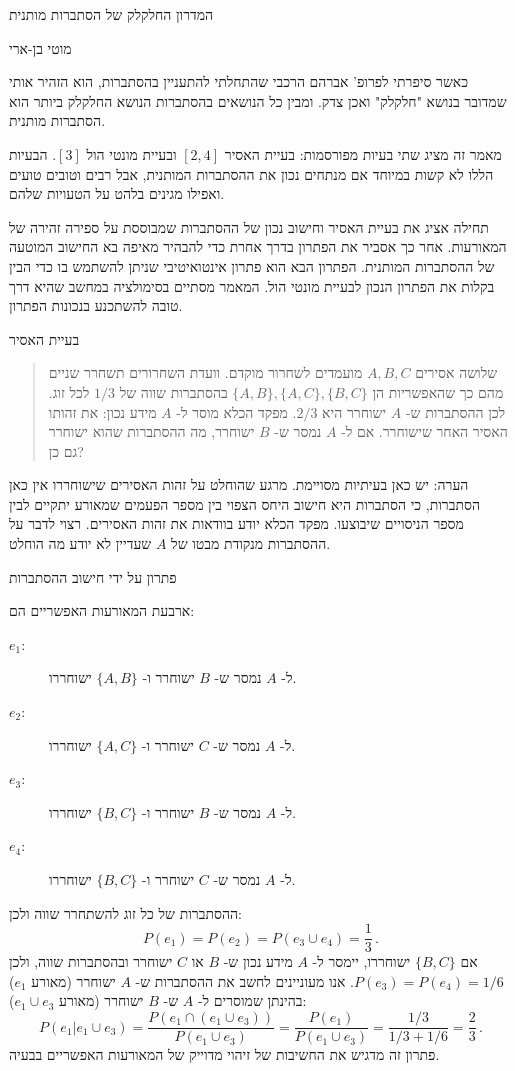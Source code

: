 \documentclass[12pt,a4paper,leqno]{article}
\begin{document}
\begin{center}
\Large
המדרון החלקלק של הסתברות מותנית

\bigskip

\Large
מוטי בן-ארי
\end{center}

כאשר סיפרתי לפרופ' אברהם הרכבי שהתחלתי להתעניין בהסתברות, הוא הזהיר אותי שמדובר בנושא "חלקלק" ואכן צדק. ומבין כל הנושאים בהסתברות הנושא החלקלק ביותר הוא הסתברות מותנית.

מאמר זה מציג שתי בעיות מפורסמות: בעיית האסיר
$[2,4]$
ובעיית מונטי הול
$[3]$.
הבעיות הללו לא קשות במיוחד אם מנתחים נכון את ההסתברות המותנית, אבל רבים וטובים טועים ואפילו מגינים בלהט על הטעויות שלהם. 

תחילה אציג את בעיית האסיר וחישוב נכון של ההסתברות שמבוססת על ספירה זהירה של המאורעות. אחר כך אסביר את הפתרון בדרך אחרת כדי להבהיר מאיפה בא החישוב המוטעה של ההסתברות המותנית. הפתרון הבא הוא פתרון אינטואיטיבי שניתן להשתמש בו כדי הבין בקלות את הפתרון הנכון לבעיית מונטי הול. המאמר מסתיים בסימולציה במחשב שהיא דרך טובה להשתכנע בנכונות הפתרון.

{\bigskip\Large
בעיית האסיר
}
\begin{quote}
שלושה אסירים 
$A,B,C$
מועמדים לשחרור מוקדם. וועדת השחרורים תשחרר שניים מהם כך שהאפשריות הן
$\{A,B\}, \{A,C\}, \{B,C\}$
בהסתברות שווה של
$1/3$
לכל זוג. לכן ההסתברות ש-%
$A$
ישוחרר היא
$2/3$.
מפקד הכלא מוסר ל-%
$A$
מידע נכון: את זהותו האסיר האחר שישוחרר. אם ל-%
$A$
נמסר ש-%
$B$
ישוחרר, מה ההסתברות שהוא ישוחרר גם כן?
\end{quote}

הערה: יש כאן בעיתיות מסויימת. מרגע שהוחלט על זהות האסירים שישוחררו אין כאן הסתברות, כי הסתברות היא חישוב היחס הצפוי בין מספר הפעמים שמאורע יתקיים לבין מספר הניסויים שיבוצעו. מפקד הכלא יודע בוודאות את זהות האסירים. רצוי לדבר על ההסתברות מנקודת מבטו של 
$A$ 
שעדיין לא יודע מה הוחלט.


{\bigskip\Large
פתרון על ידי חישוב ההסתברות}


ארבעת המאורעות האפשריים הם:
\begin{description}
\item[$e_1$:] 
ל-%
$A$
נמסר ש-%
$B$
ישוחרר ו-%
$\{A,B\}$
ישוחררו.
\item[$e_2$:]
ל-%
$A$
נמסר ש-%
$C$
ישוחרר ו-%
$\{A,C\}$
ישוחררו.
\item[$e_3$:]
ל-%
$A$
נמסר ש-%
$B$
ישוחרר ו-%
$\{B,C\}$
ישוחררו.
\item[$e_4$:]
ל-%
$A$
נמסר ש-%
$C$
ישוחרר ו-%
$\{B,C\}$
ישוחררו.
\end{description}
ההסתברות של כל זוג להשתחרר שווה ולכן:
\[
P(e_1)=P(e_2)=P(e_3\cup e_4)=\frac{1}{3}\,.
\]
אם 
$\{B,C\}$
ישוחררו, יימסר ל-%
$A$
מידע נכון ש-%
$B$
או 
$C$
ישוחרר ובהסתברות שווה, ולכן
$P(e_3)=P(e_4)=1/6$.
אנו מעוניינים לחשב את ההסתברות ש-%
$A$
ישוחרר (מאורע
$e_1$)
בהינתן שמוסרים ל-%
$A$
ש-%
$B$
ישוחרר (מאורע
$e_1\cup e_3$):
\[
P(e_1|e_1\cup e_3) = \frac{P(e_1\cap(e_1\cup e_3))}{P(e_1\cup e_3)}=\frac{P(e_1)}{P(e_1\cup e_3)}=\frac{1/3}{1/3+1/6}=\frac{2}{3}\,.
\]
פתרון זה מדגיש את החשיבות של זיהוי מדוייק של המאורעות האפשריים בבעיה.
\end{document}

